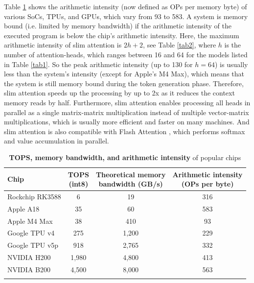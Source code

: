 \documentclass{article}
\def\fline{\Xhline{2\arrayrulewidth}} %
\begin{document}
Table \ref{tab3} shows the arithmetic intensity (now defined as OPs per memory byte) of various SoCs, TPUs, and GPUs, which vary from 93 to 583. A system is memory bound (i.e. limited by memory bandwidth) if the arithmetic intensity of the executed program is below the chip’s arithmetic intensity. Here, the maximum arithmetic intensity of slim attention is $2h+2$, see Table \ref{tab2}, where $h$ is the number of attention-heads, which ranges between 16 and 64 for the models listed in Table \ref{tab1}. So the peak arithmetic intensity (up to 130 for $h = 64$) is usually less than the system’s intensity (except for Apple's M4 Max), which means that the system is still memory bound during the token generation phase. Therefore, slim attention speeds up the processing by up to 2x as it reduces the context memory reads by half. Furthermore, slim attention enables processing all heads in parallel as a single matrix-matrix multiplication instead of multiple vector-matrix multiplications, which is usually more efficient and faster on many machines. And slim attention is also compatible with Flash Attention \citep{flash-attention}, which performs softmax and value accumulation in parallel.
\begingroup \renewcommand{\arraystretch}{1.3} %
\begin{table}[h!] \centering
\caption{\textbf{TOPS, memory bandwidth, and arithmetic intensity} of popular chips}
\begin{tabular}{lccc} \fline
  Chip & \makecell{TOPS \\ (int8)} & \makecell{Theoretical memory \\ bandwidth (GB/s)} & \makecell{Arithmetic intensity \\ (OPs per byte)} \\ \hline
  Rockchip RK3588                  & 6      & 19      & 316 \\
  Apple A18 \citep{apple-wiki}     & 35     & 60      & 583 \\
  Apple M4 Max \citep{apple-wiki}  & 38     & 410     & 93  \\
  Google TPU v4 \citep{TPU-wiki}   & 275    & 1,200   & 229 \\
  Google TPU v5p \citep{TPU-wiki}  & 918    & 2,765   & 332 \\
  NVIDIA H200 \citep{nvidia-wiki}  & 1,980  & 4,800   & 413 \\
  NVIDIA B200 \citep{nvidia-wiki}  & 4,500  & 8,000   & 563 \\ \fline
\end{tabular} \label{tab3} \end{table} \endgroup
\end{document}
